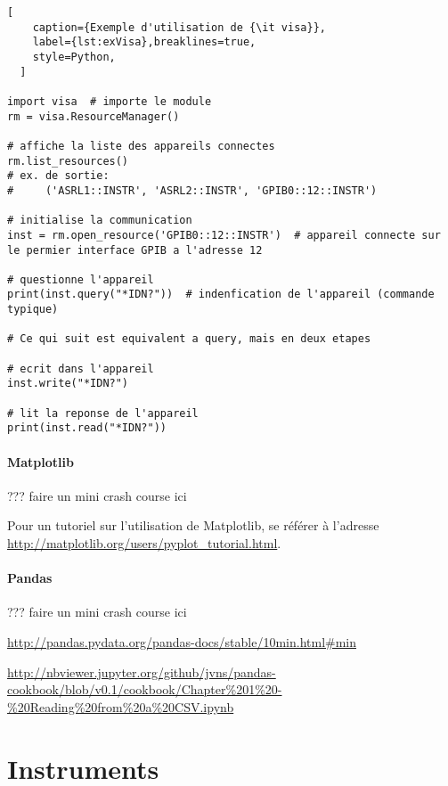 \documentclass[11pt,francais]{book} %
\begin{document}
\begin{lstlisting}[
    caption={Exemple d'utilisation de {\it visa}},
    label={lst:exVisa},breaklines=true,
    style=Python,
  ]  
 
import visa  # importe le module
rm = visa.ResourceManager()

# affiche la liste des appareils connectes
rm.list_resources()  
# ex. de sortie:
#     ('ASRL1::INSTR', 'ASRL2::INSTR', 'GPIB0::12::INSTR')

# initialise la communication
inst = rm.open_resource('GPIB0::12::INSTR')  # appareil connecte sur le permier interface GPIB a l'adresse 12

# questionne l'appareil
print(inst.query("*IDN?"))  # indenfication de l'appareil (commande typique)

# Ce qui suit est equivalent a query, mais en deux etapes

# ecrit dans l'appareil
inst.write("*IDN?")

# lit la reponse de l'appareil
print(inst.read("*IDN?"))

\end{lstlisting}

\subsubsection{Matplotlib}

??? faire un mini crash course ici

Pour un tutoriel sur l'utilisation de Matplotlib, se référer à l'adresse \url{http://matplotlib.org/users/pyplot_tutorial.html}.

\subsubsection{Pandas}

??? faire un mini crash course ici

\url{http://pandas.pydata.org/pandas-docs/stable/10min.html#min}

\url{http://nbviewer.jupyter.org/github/jvns/pandas-cookbook/blob/v0.1/cookbook/Chapter%201%20-%20Reading%20from%20a%20CSV.ipynb}




\chapter{Instruments}
\end{document}
